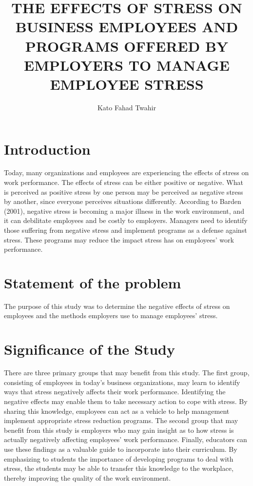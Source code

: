 \documentclass[]{article}
\begin{document}
\title{THE EFFECTS OF STRESS ON BUSINESS EMPLOYEES
	AND PROGRAMS OFFERED BY EMPLOYERS
	TO MANAGE EMPLOYEE STRESS }
\author{Kato Fahad Twahir}
\maketitle

\section{Introduction}
	Today, many organizations and employees are experiencing the effects of stress on
work performance. The effects of stress can be either positive or negative. What is
perceived as positive stress by one person may be perceived as negative stress by
another, since everyone perceives situations differently. According to Barden (2001),
negative stress is becoming a major illness in the work environment, and it can
debilitate employees and be costly to employers. Managers need to identify those
suffering from negative stress and implement programs as a defense against stress.
These programs may reduce the impact stress has on employees' work performance.

\section{Statement of the problem}
The purpose of this study was to determine the negative effects of stress on employees
and the methods employers use to manage employees' stress.


\section{Significance of the Study}
There are three primary groups that may benefit from this study. The first group,
consisting of employees in today's business organizations, may learn to identify ways
that stress negatively affects their work performance. Identifying the negative effects
may enable them to take necessary action to cope with stress. By sharing this
knowledge, employees can act as a vehicle to help management implement appropriate
stress reduction programs. The second group that may benefit from this study is
employers who may gain insight as to how stress is actually negatively affecting
employees’ work performance. Finally, educators can use these findings as a valuable
guide to incorporate into their curriculum. By emphasizing to students the importance
of developing programs to deal with stress, the students may be able to transfer this
knowledge to the workplace, thereby improving the quality of the work environment.
\end{document}
